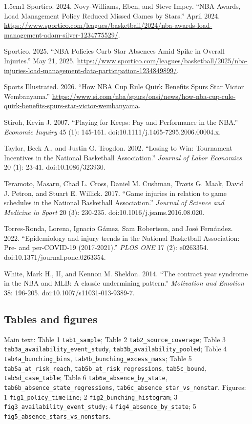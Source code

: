 \documentclass[11pt]{article}
\begin{document}
\begin{hangparas}{1.5em}{1}
Sportico. 2024. Novy-Williams, Eben, and Steve Impey. ``NBA Awards, Load Management Policy Reduced Missed Games by Stars.'' April 2024. \url{https://www.sportico.com/leagues/basketball/2024/nba-awards-load-management-adam-silver-1234775529/}.

Sportico. 2025. ``NBA Policies Curb Star Absences Amid Spike in Overall Injuries.'' May 21, 2025. \url{https://www.sportico.com/leagues/basketball/2025/nba-injuries-load-management-data-participation-1234849899/}.

Sports Illustrated. 2026. ``How NBA Cup Rule Quirk Benefits Spurs Star Victor Wembanyama.'' \url{https://www.si.com/nba/spurs/onsi/news/how-nba-cup-rule-quirk-benefits-spurs-star-victor-wembanyama}.

Stiroh, Kevin J. 2007. ``Playing for Keeps: Pay and Performance in the NBA.'' \emph{Economic Inquiry} 45 (1): 145-161. doi:10.1111/j.1465-7295.2006.00004.x.

Taylor, Beck A., and Justin G. Trogdon. 2002. ``Losing to Win: Tournament Incentives in the National Basketball Association.'' \emph{Journal of Labor Economics} 20 (1): 23-41. doi:10.1086/323930.

Teramoto, Masaru, Chad L. Cross, Daniel M. Cushman, Travis G. Maak, David J. Petron, and Stuart E. Willick. 2017. ``Game injuries in relation to game schedules in the National Basketball Association.'' \emph{Journal of Science and Medicine in Sport} 20 (3): 230-235. doi:10.1016/j.jsams.2016.08.020.

Torres-Ronda, Lorena, Ignacio Gámez, Sam Robertson, and José Fernández. 2022. ``Epidemiology and injury trends in the National Basketball Association: Pre- and per-COVID-19 (2017-2021).'' \emph{PLOS ONE} 17 (2): e0263354. doi:10.1371/journal.pone.0263354.

White, Mark H., II, and Kennon M. Sheldon. 2014. ``The contract year syndrome in the NBA and MLB: A classic undermining pattern.'' \emph{Motivation and Emotion} 38: 196-205. doi:10.1007/s11031-013-9389-7.

\end{hangparas}
\endgroup


\subsection*{Tables and figures}


Main text: Table 1 \texttt{tab1\_sample}; Table 2 \texttt{tab2\_source\_coverage}; Table 3 \texttt{tab3a\_availability\_event\_study}, \texttt{tab3b\_availability\_pooled}; Table 4 \texttt{tab4a\_bunching\_bins}, \texttt{tab4b\_bunching\_excess\_mass}; Table 5 \texttt{tab5a\_at\_risk\_reach}, \texttt{tab5b\_at\_risk\_regressions}, \texttt{tab5c\_bound}, \texttt{tab5d\_case\_table}; Table 6 \texttt{tab6a\_absence\_by\_state}, \texttt{tab6b\_absence\_state\_regressions}, \texttt{tab6c\_absence\_star\_vs\_nonstar}. Figures: 1 \texttt{fig1\_policy\_timeline}; 2 \texttt{fig2\_bunching\_histogram}; 3 \texttt{fig3\_availability\_event\_study}; 4 \texttt{fig4\_absence\_by\_state}; 5 \texttt{fig5\_absence\_stars\_vs\_nonstars}.
\end{document}
